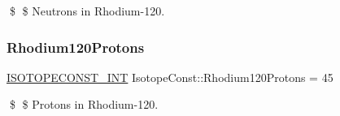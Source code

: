 \$ \$ Neutrons in Rhodium-\/120. \mbox{\label{group___isotope_const-_rhodium-_rh120_ga105a244346cec6cdd028fb87e3a375dc}} 
\subsubsection{\texorpdfstring{Rhodium120\+Protons}{Rhodium120Protons}}
{\footnotesize\ttfamily \mbox{\hyperlink{group___isotope_const-_macros_ga5f18360b3e99483a35c32d789e62621c}{I\+S\+O\+T\+O\+P\+E\+C\+O\+N\+S\+T\+\_\+\+I\+NT}} Isotope\+Const\+::\+Rhodium120\+Protons = 45}

\$ \$ Protons in Rhodium-\/120. 